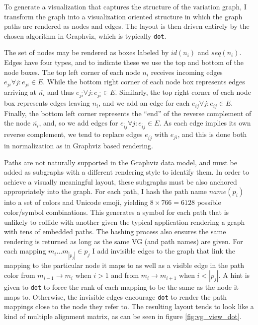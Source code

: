 To generate a visualization that captures the structure of the variation graph, I transform the graph into a visualization oriented structure in which the graph paths are rendered as nodes and edges.
The layout is then driven entirely by the chosen algorithm in Graphviz, which is typically {\tt dot}.

The set of nodes may be rendered as boxes labeled by $id(n_i)$ and $seq(n_i)$.
Edges have four types, and to indicate these we use the top and bottom of the node boxes.
The top left corner of each node $n_i$ receives incoming edges $e_{ji} \forall j : e_{ji} \in E$.
While the bottom right corner of each node box represents edges arriving at $\overline{n_i}$ and thus $e_{j\overline{i}} \forall j : e_{j\overline{i}} \in E$.
Similarly, the top right corner of each node box represents edges leaving $n_i$, and we add an edge for each $e_{ij} \forall j : e_{ij} \in E$.
Finally, the bottom left corner represents the ``end'' of the reverse complement of the node $\overline{n_i}$, and, so we add edges for $e_{\overline{i}j} \forall j : e_{\overline{i}j} \in E$.
As each edge implies its own reverse complement, we tend to replace edges $e_{\overline{ij}}$ with $e_{ji}$, and this is done both in normalization as in Graphviz based rendering.

Paths are not naturally supported in the Graphviz data model, and must be added as subgraphs with a different rendering style to identify them.
In order to achieve a visually meaningful layout, these subgraphs must be also anchored appropriately into the graph.
For each path, I hash the path name $name(p_i)$ into a set of colors and Unicode emoji, yielding $8 \times 766 = 6128$ possible color/symbol combinations.
This generates a symbol for each path that is unlikely to collide with another given the typical application rendering a graph with tens of embedded paths.
The hashing process also ensures the same rendering is returned as long as the same VG (and path names) are given.
For each mapping $m_i\ldots m_{|p_j|} \in p_j$ I add invisible edges to the graph that link the mapping to the particular node it maps to as well as a visible edge in the path color from $m_{i-1} \to m_i$ when $i > 1$ and from $m_i \to m_{i+1}$ when $i < |p_j|$.
A hint is given to {\tt dot} to force the rank of each mapping to be the same as the node it maps to.
Otherwise, the invisible edges encourage {\tt dot} to render the path mappings close to the node they refer to.
The resulting layout tends to look like a kind of multiple alignment matrix, as can be seen in figure \ref{fig:vg_view_dot}.

